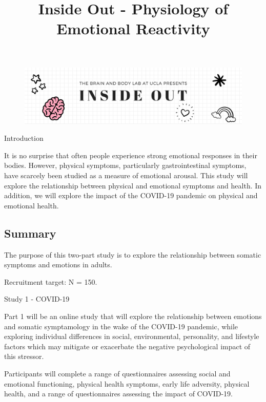 \documentclass[]{book}
\title{Inside Out - Physiology of Emotional Reactivity}
\author{}
\date{\vspace{-2.5em}}
\begin{document}
\maketitle

{
\setcounter{tocdepth}{1}
\tableofcontents
}
\hypertarget{section}{%
\chapter{}\label{section}}

\begin{figure}
\centering
\includegraphics{images/inside_out_banner.png}
\caption{}
\end{figure}

Introduction

It is no surprise that often people experience strong emotional responses in their bodies. However, physical symptoms, particularly gastrointestinal symptoms, have scarcely been studied as a measure of emotional arousal. This study will explore the relationship between physical and emotional symptoms and health. In addition, we will explore the impact of the COVID-19 pandemic on physical and emotional health.

\hypertarget{summary}{%
\section{Summary}\label{summary}}

The purpose of this two-part study is to explore the relationship between somatic symptoms and emotions in adults.

Recruitment target: N = 150.

Study 1 - COVID-19

Part 1 will be an online study that will explore the relationship between emotions and somatic symptamology in the wake of the COVID-19 pandemic, while exploring individual differences in social, environmental, personality, and lifestyle factors which may mitigate or exacerbate the negative psychological impact of this stressor.

Participants will complete a range of questionnaires assessing social and emotional functioning, physical health symptoms, early life adversity, physical health, and a range of questionnaires assessing the impact of COVID-19.
\end{document}
